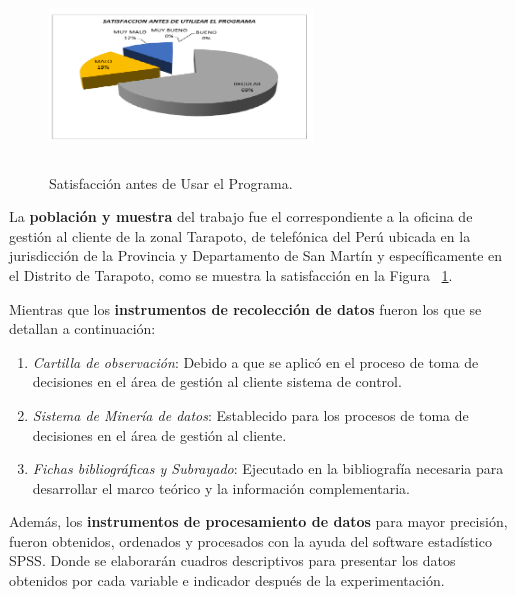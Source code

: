 \documentclass[10pt,journal]{IEEEtran}
\begin{document}
\begin{itemize}
         \begin{figure}[H]
      \begin{center}
        \includegraphics[width=7cm, height=5cm]{figuras/mininv4.PNG}
        \caption{Satisfacción antes de Usar el Programa.}
        \label{mininv4} 
        \end{center}
    \end{figure} 
         
        La \textbf{población y muestra} del trabajo fue el correspondiente a la oficina de gestión al cliente de la zonal Tarapoto, de telefónica del Perú ubicada en la jurisdicción de la Provincia y Departamento de San Martín y específicamente en el Distrito de Tarapoto, como se muestra la satisfacción en la Figura ~\ref{mininv4}.
         
        Mientras que los \textbf{instrumentos de recolección de datos} fueron los que se detallan a continuación:
        \begin{enumerate}
        \item \textit{Cartilla de observación}: Debido a que se aplicó en el proceso de toma de decisiones en el área de gestión al cliente sistema de control.
        \item \textit{Sistema de Minería de datos}: Establecido para los procesos de toma de decisiones en el área de gestión al cliente.
        \item \textit{Fichas bibliográficas y Subrayado}: Ejecutado en la bibliografía necesaria para desarrollar el marco teórico y la información complementaria.
        \end{enumerate} 
        
        Además, los \textbf{instrumentos de procesamiento de datos} para mayor precisión, fueron obtenidos, ordenados y procesados con la ayuda del software estadístico SPSS. Donde se elaborarán cuadros descriptivos para presentar los datos obtenidos por cada variable e indicador después de la experimentación.
        

\end{itemize}
\end{document}
